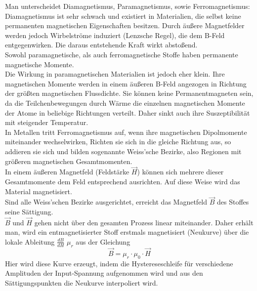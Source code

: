\documentclass[12pt,a4paper]{article}
\begin{document}
\begin{multicols}{2}
Man unterscheidet Diamagnetismus, Paramagnetismus, sowie Ferromagnetismus:\\
Diamagnetismus ist sehr schwach und existiert in Materialien, die selbst keine permanenten magnetischen Eigenschaften besitzen. Durch äußere Magnetfelder werden jedoch Wirbelströme induziert (Lenzsche Regel), die dem B-Feld entgegenwirken. Die daraus entstehende Kraft wirkt abstoßend.\\

Sowohl paramagnetische, als auch ferromagnetische Stoffe haben permanente magnetische Momente.\\
Die Wirkung in paramagnetischen Materialien ist jedoch eher klein. Ihre magnetischen Momente werden in einem äußeren B-Feld angezogen in Richtung der größten magnetischen Flussdichte. Sie können keine Permanentmagneten sein, da die Teilchenbewegungen durch Wärme die einzelnen magnetischen Momente der Atome in beliebige Richtungen verteilt. Daher sinkt auch ihre Suszeptibilität mit steigender Temperatur.\\

In Metallen tritt Ferromagnetismus auf, wenn ihre magnetischen Dipolmomente miteinander wechselwirken, Richten sie sich in die gleiche Richtung aus, so addieren sie sich und bilden sogenannte Weiss'sche Bezirke, also Regionen mit größeren magnetischen Gesamtmomenten.\\
In einem äußeren Magnetfeld (Feldstärke $\vec H$) können sich mehrere dieser Gesamtmomente dem Feld entsprechend ausrichten. Auf diese Weise wird das Material magnetisiert.\\
Sind alle Weiss'schen Bezirke ausgerichtet, erreicht das Magnetfeld $\vec B$ des Stoffes seine Sättigung.\\
$\vec B$ und $\vec H$ gehen nicht über den gesamten Prozess linear miteinander. Daher erhält man, wird ein entmagnetisierter Stoff erstmals magnetisiert (Neukurve) über die lokale Ableitung $\frac{dB}{dH}$ $\mu_r$ aus der Gleichung
$$\vec B = \mu_r \cdot \mu_0 \cdot \vec H$$
Hier wird diese Kurve erzeugt, indem die Hystereseschleife für verschiedene Amplituden der Input-Spannung aufgenommen wird und aus den Sättigungspunkten die Neukurve interpoliert wird.




\end{multicols}
\end{document}
